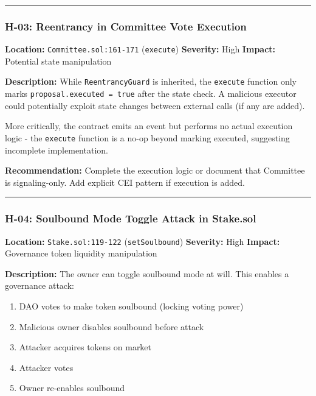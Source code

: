 \documentclass[
]{article}
\providecommand{\tightlist}{%
  \setlength{\itemsep}{0pt}\setlength{\parskip}{0pt}}
\begin{document}
\begin{center}\rule{0.5\linewidth}{0.5pt}\end{center}

\subsubsection{H-03: Reentrancy in Committee Vote
Execution}\label{h-03-reentrancy-in-committee-vote-execution}

\textbf{Location:} \texttt{Committee.sol:161-171} (\texttt{execute})
\textbf{Severity:} High \textbf{Impact:} Potential state manipulation

\textbf{Description:} While \texttt{ReentrancyGuard} is inherited, the
\texttt{execute} function only marks \texttt{proposal.executed\ =\ true}
after the state check. A malicious executor could potentially exploit
state changes between external calls (if any are added).

More critically, the contract emits an event but performs no actual
execution logic - the \texttt{execute} function is a no-op beyond
marking executed, suggesting incomplete implementation.

\textbf{Recommendation:} Complete the execution logic or document that
Committee is signaling-only. Add explicit CEI pattern if execution is
added.

\begin{center}\rule{0.5\linewidth}{0.5pt}\end{center}

\subsubsection{H-04: Soulbound Mode Toggle Attack in
Stake.sol}\label{h-04-soulbound-mode-toggle-attack-in-stakesol}

\textbf{Location:} \texttt{Stake.sol:119-122} (\texttt{setSoulbound})
\textbf{Severity:} High \textbf{Impact:} Governance token liquidity
manipulation

\textbf{Description:} The owner can toggle soulbound mode at will. This
enables a governance attack:

\begin{enumerate}
\def\labelenumi{\arabic{enumi}.}
\tightlist
\item
  DAO votes to make token soulbound (locking voting power)
\item
  Malicious owner disables soulbound before attack
\item
  Attacker acquires tokens on market
\item
  Attacker votes
\item
  Owner re-enables soulbound
\end{enumerate}
\end{document}
